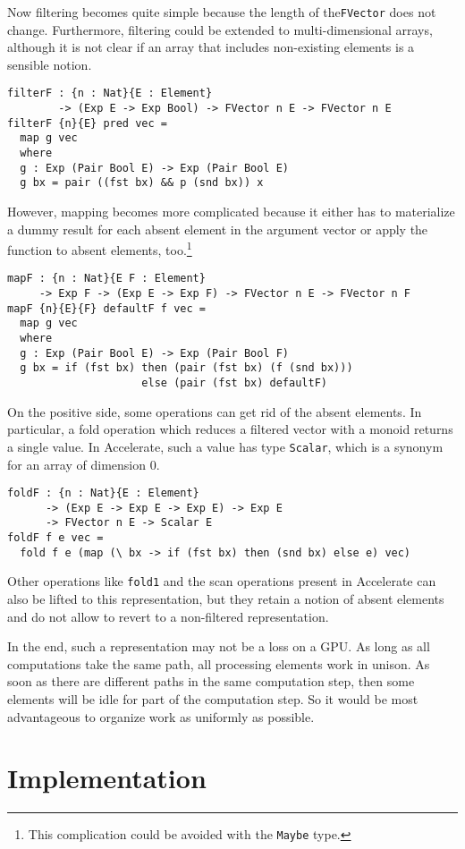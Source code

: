 \documentclass{llncs}
\begin{document}
Now filtering becomes quite simple because the length of
the\texttt{FVector} does not change. Furthermore, filtering could be
extended to multi-dimensional arrays, although it is not clear if an
array that includes non-existing elements is a sensible notion.
\begin{verbatim}
filterF : {n : Nat}{E : Element}
        -> (Exp E -> Exp Bool) -> FVector n E -> FVector n E
filterF {n}{E} pred vec =
  map g vec
  where
  g : Exp (Pair Bool E) -> Exp (Pair Bool E)
  g bx = pair ((fst bx) && p (snd bx)) x
\end{verbatim}
However, mapping becomes more complicated because it either has to
materialize a dummy result for each absent element in the argument
vector or apply the function to absent elements, too.\footnote{This
  complication could be avoided with the \texttt{Maybe} type.}
\begin{verbatim}
mapF : {n : Nat}{E F : Element}
     -> Exp F -> (Exp E -> Exp F) -> FVector n E -> FVector n F
mapF {n}{E}{F} defaultF f vec =
  map g vec
  where
  g : Exp (Pair Bool E) -> Exp (Pair Bool F)
  g bx = if (fst bx) then (pair (fst bx) (f (snd bx)))
                     else (pair (fst bx) defaultF)
\end{verbatim}
On the positive side, some operations can get rid of the absent
elements. In particular, a fold operation which reduces a filtered
vector with a monoid returns a single value. In Accelerate, such a value has type
\texttt{Scalar}, which is a synonym for an array of dimension $0$.
\begin{verbatim}
foldF : {n : Nat}{E : Element}
      -> (Exp E -> Exp E -> Exp E) -> Exp E
      -> FVector n E -> Scalar E
foldF f e vec =
  fold f e (map (\ bx -> if (fst bx) then (snd bx) else e) vec)
\end{verbatim}
Other operations like \texttt{fold1} and the scan operations present
in Accelerate can also be lifted to this representation, but they
retain a notion of absent elements and do not allow to revert to a
non-filtered representation. 

In the end, such a representation may not be a loss on a GPU. As long
as all computations take the same path, all processing elements work
in unison. As soon as there are different paths in the same
computation step, then some elements will be idle for part of the
computation step. So it would be most advantageous to organize work as
uniformly as possible. 


\section{Implementation}
\label{sec:implementation}
\end{document}
